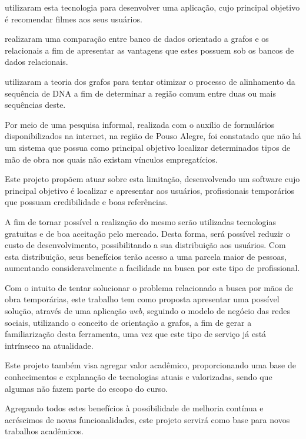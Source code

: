 \par {} utilizaram esta tecnologia para desenvolver uma aplicação, cujo principal objetivo é recomendar filmes aos seus usuários.

\par {} realizaram uma comparação entre banco de dados orientado a grafos e os relacionais a fim de apresentar as vantagens que estes possuem sob os bancos de dados relacionais.

\par {} utilizaram a teoria dos grafos para tentar otimizar o processo de alinhamento da sequência de DNA a fim de determinar a região comum entre duas ou mais sequências deste.

\par Por meio de uma pesquisa informal, realizada com o auxílio de formulários disponibilizados na internet, na região de Pouso Alegre, foi constatado que não há um sistema que possua como principal objetivo localizar determinados tipos de mão de obra nos quais não existam vínculos empregatícios.

\par Este projeto propõem atuar sobre esta limitação, desenvolvendo um software cujo principal objetivo é localizar e apresentar aos usuários, profissionais temporários que possuam credibilidade e boas referências.

\par A fim de tornar possível a realização do mesmo serão utilizadas tecnologias gratuitas e de boa aceitação pelo mercado. Desta forma, será possível reduzir o custo de desenvolvimento, possibilitando a sua distribuição aos usuários. Com esta distribuição, seus benefícios terão acesso a uma parcela maior de pessoas, aumentando consideravelmente a facilidade na busca por este tipo de profissional.


\par Com o intuito de tentar solucionar o problema relacionado a busca por mãos de obra temporárias, este trabalho tem como proposta apresentar uma possível solução, através de uma aplicação \textit{web}, seguindo o modelo de negócio das redes sociais, utilizando o conceito de orientação a grafos, a fim de gerar a familiarização desta ferramenta, uma vez que este tipo de serviço já está intrínseco na atualidade.

\par Este projeto também visa agregar valor acadêmico, proporcionando uma base de conhecimentos e explanação de tecnologias atuais e valorizadas, sendo que algumas não fazem parte do escopo do curso.

\par Agregando todos estes benefícios à possibilidade de melhoria contínua e acréscimos de novas funcionalidades, este projeto servirá como base para novos trabalhos acadêmicos.